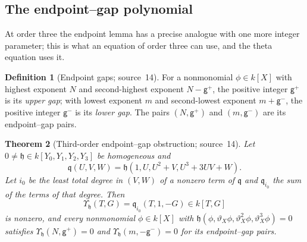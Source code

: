 \documentclass[11pt]{article}
\numberwithin{equation}{section}
\newtheorem{theorem}{Theorem}[section]
\theoremstyle{definition}
\newtheorem{definition}[theorem]{Definition}
\theoremstyle{remark}
\begin{document}
\subsection{The endpoint--gap polynomial}\label{hol:ot:sub:gaps}

At order three the endpoint lemma has a precise analogue with one more
integer parameter; this is what an equation of order three can use, and the
theta equation uses it.

\begin{definition}[Endpoint gaps; source~14]\label{hol:ot:def:gaps}
For a nonmonomial $\phi\in k[X]$ with highest exponent $N$ and second-highest
exponent $N-\mathsf g^+$, the positive integer $\mathsf g^+$ is its
\emph{upper gap}; with lowest exponent $m$ and second-lowest exponent
$m+\mathsf g^-$, the positive integer $\mathsf g^-$ is its \emph{lower gap}.
The pairs $(N,\mathsf g^+)$ and $(m,\mathsf g^-)$ are its endpoint--gap
pairs.
\end{definition}

\begin{theorem}[Third-order endpoint--gap obstruction; source~14]
\label{hol:ot:thm:gaps}
Let $0\ne\mathfrak h\in k[Y_0,Y_1,Y_2,Y_3]$ be homogeneous and
\begin{equation}\label{hol:ot:eq:dehom3}
 \mathfrak q(U,V,W)=\mathfrak h(1,U,U^2+V,U^3+3UV+W).
\end{equation}
Let $i_0$ be the least total degree in $(V,W)$ of a nonzero term of
$\mathfrak q$ and $\mathfrak q_{i_0}$ the sum of the terms of that degree. Then
\begin{equation}\label{hol:ot:eq:upsilon}
 \Upsilon_{\mathfrak h}(T,G)=\mathfrak q_{i_0}(T,1,-G)\in k[T,G]
\end{equation}
is nonzero, and every nonmonomial $\phi\in k[X]$ with
$\mathfrak h(\phi,\vartheta_X\phi,\vartheta_X^2\phi,\vartheta_X^3\phi)=0$
satisfies $\Upsilon_{\mathfrak h}(N,\mathsf g^+)=0$ and
$\Upsilon_{\mathfrak h}(m,-\mathsf g^-)=0$ for its endpoint--gap pairs.
\end{theorem}
\end{document}
